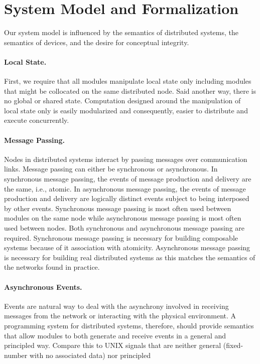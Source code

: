 \documentclass[letterpaper]{article}
\begin{document}



\pagebreak

\section{System Model and Formalization\label{system_model}}

Our system model is influenced by the semantics of distributed systems, the semantics of devices, and the desire for conceptual integrity.

\paragraph{Local State.}
First, we require that all modules manipulate local state only including modules that might be collocated on the same distributed node. 
Said another way, there is no global or shared state.
Computation designed around the manipulation of local state only is easily modularized and consequently, easier to distribute and execute concurrently.

\paragraph{Message Passing.}
Nodes in distributed systems interact by passing messages over communication links.
Message passing can either be synchronous or asynchronous.
In synchronous message passing, the events of message production and delivery are the same, i.e., atomic.
In asynchronous message passing, the events of message production and delivery are logically distinct events subject to being interposed by other events.
Synchronous message passing is most often used between modules on the same node while asynchronous message passing is most often used between nodes.
Both synchronous and asynchronous message passing are required.
Synchronous message passing is necessary for building composable systems because of it association with atomicity.
Asynchronous message passing is necessary for building real distributed systems as this matches the semantics of the networks found in practice.

\paragraph{Asynchronous Events.}
Events are natural way to deal with the asynchrony involved in receiving messages from the network or interacting with the physical environment.
A programming system for distributed systems, therefore, should provide semantics that allow modules to both generate and receive events in a general and principled way.
Compare this to UNIX signals that are neither general (fixed-number with no associated data) nor principled
\end{document}
